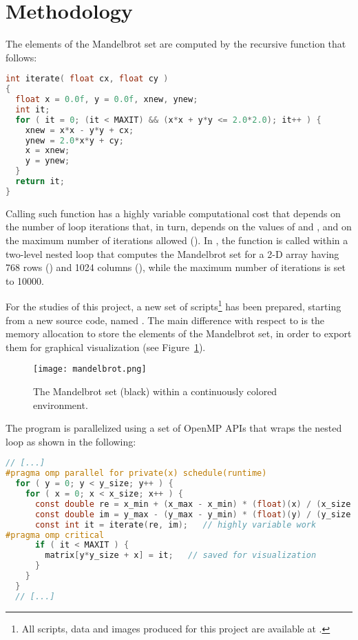 \section{Methodology}\label{sec:method}
The elements of the Mandelbrot set are computed by the recursive function  that follows:

\begin{lstlisting}[language=C]
int iterate( float cx, float cy )
{
  float x = 0.0f, y = 0.0f, xnew, ynew;
  int it;
  for ( it = 0; (it < MAXIT) && (x*x + y*y <= 2.0*2.0); it++ ) {
    xnew = x*x - y*y + cx;
    ynew = 2.0*x*y + cy;
    x = xnew;
    y = ynew;
  }
  return it;
}
\end{lstlisting}

\noindent
Calling such function has a highly variable computational cost that depends on the number of loop iterations that, in turn, depends on the values of  and , and on the maximum number of iterations allowed (). In , the  function is called within a two-level nested loop that computes the Mandelbrot set for a 2-D array having 768 rows () and 1024 columns (), while the maximum number of iterations is set to 10000.

For the studies of this project, a new set of scripts\footnote{All scripts, data and images produced for this project are available at \href{https://github.com/mbarbetti/ppf-omp-project}{}.} has been prepared, starting from a new source code, named . The main difference with respect to  is the memory allocation to store the elements of the Mandelbrot set, in order to export them for graphical visualization (see Figure~\ref{fig:mandelbrot}). 

\begin{figure}[b!]
    \centering
    \texttt{[image: mandelbrot.png]}
    \caption{\label{fig:mandelbrot}
    The Mandelbrot set (black) within a continuously colored environment.
    }
\end{figure}

The program is parallelized using a set of OpenMP APIs that wraps the nested loop as shown in the following:

\newpage

\begin{lstlisting}[language=C]
  // [...]
#pragma omp parallel for private(x) schedule(runtime)
  for ( y = 0; y < y_size; y++ ) {
    for ( x = 0; x < x_size; x++ ) {
      const double re = x_min + (x_max - x_min) * (float)(x) / (x_size - 1);
      const double im = y_max - (y_max - y_min) * (float)(y) / (y_size - 1);
      const int it = iterate(re, im);   // highly variable work
#pragma omp critical
	  if ( it < MAXIT ) {
	    matrix[y*y_size + x] = it;   // saved for visualization
      }
    }
  }
  // [...]
\end{lstlisting}

